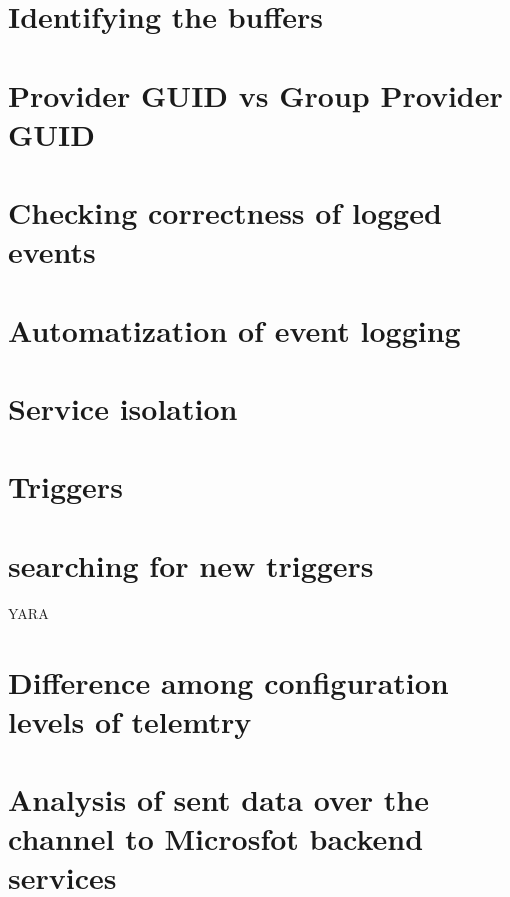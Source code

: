 \section{Identifying the buffers}
\section{Provider GUID vs Group Provider GUID}
\section{Checking correctness of logged events}
\section{Automatization of event logging}
\section{Service isolation}
\section{Triggers}
\section{searching for new triggers} YARA
\section{Difference among configuration levels of telemtry}
\section{Analysis of sent data over the channel to Microsfot backend services}
